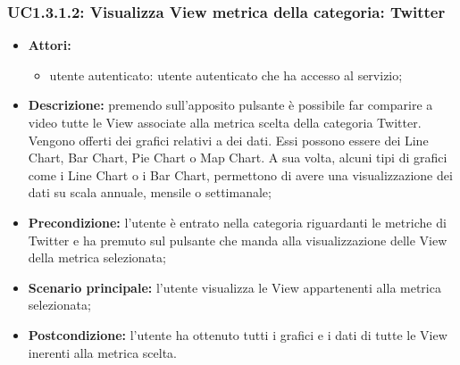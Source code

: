 \subsubsection{UC1.3.1.2: Visualizza View metrica della categoria: Twitter}
\begin{itemize}
	\item \textbf{Attori:}
	\begin{itemize}
		\item utente autenticato: utente autenticato che ha accesso al servizio;
	\end{itemize}
	\item \textbf{Descrizione:} premendo sull'apposito pulsante è possibile far comparire a video tutte le View associate alla metrica scelta della categoria Twitter. Vengono offerti dei grafici relativi a dei dati. Essi possono essere dei Line Chart, Bar Chart, Pie Chart o Map Chart. A sua volta, alcuni tipi di grafici come i Line Chart o i Bar Chart, permettono di avere una visualizzazione dei dati su scala annuale, mensile o settimanale;
	\item \textbf{Precondizione:} l'utente è entrato nella categoria riguardanti le metriche di Twitter e ha premuto sul pulsante che manda alla visualizzazione delle View della metrica selezionata;
	\item \textbf{Scenario principale:} l'utente visualizza le View appartenenti alla metrica selezionata;
	\item \textbf{Postcondizione:} l'utente ha ottenuto tutti i grafici e i dati di tutte le View inerenti alla metrica scelta.
\end{itemize}

